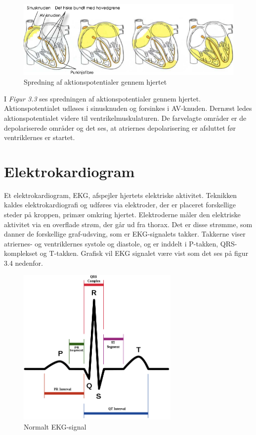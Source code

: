 \begin{figure}[htb]

	\centering	
	\includegraphics[width=1\textwidth]{Figurer/Snip20150410_6}
	\caption{Spredning af aktionspotentialer gennem hjertet \protect\footnotemark}
\end{figure}

I \textit{Figur 3.3} ses spredningen af aktionspotentialer gennem hjertet. Aktionspotentialet udløses i sinusknuden og forsinkes i AV-knuden. Dernæst ledes aktionspotentialet videre til ventrikelmuskulaturen. De farvelagte områder er de depolariserede områder og det ses, at atriernes depolarisering er afsluttet før ventriklernes er startet.

\section{Elektrokardiogram}
Et elektrokardiogram, EKG, afspejler hjertets elektriske aktivitet. Teknikken kaldes elektrokardiografi og udføres via elektroder, der er placeret forskellige steder på kroppen, primær omkring hjertet. Elektroderne måler den elektriske aktivitet via en overflade strøm, der går ud fra thorax. Det er disse strømme, som danner de forskellige graf-udsving, som er EKG-signalets takker. Takkerne viser atriernes- og ventriklernes systole og diastole, og er inddelt i P-takken, QRS-komplekset og T-takken. Grafisk vil EKG signalet være vist som det ses på figur 3.4 nedenfor.

\begin{figure}[H]
	\centering
	\includegraphics[width=0.7\textwidth]{Figurer/Snip20150412_36}
	\caption{Normalt EKG-signal \protect\footnotemark}
\end{figure}

